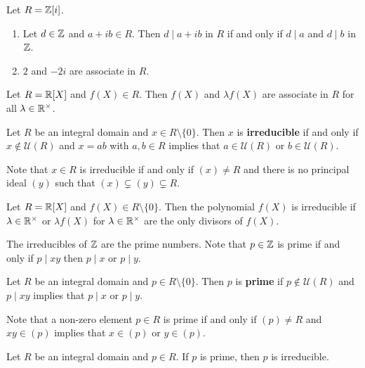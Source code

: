 \begin{example}
	Let $R=\mathbb{Z}[i]$. 
	\begin{enumerate}
		\item Let $d\in\mathbb{Z}$ and $a+ib\in R$. Then $d\mid a+ib$ in $R$ if and only if 
			$d\mid a$ and $d\mid b$ in $\mathbb{Z}$. 
		\item $2$ and $-2i$ are associate in $R$.
	\end{enumerate} 	
\end{example}

\begin{example}
	Let $R=\mathbb{R}[X]$ and $f(X)\in R$. Then $f(X)$ and $\lambda f(X)$ are 
	associate in $R$ for all $\lambda\in\mathbb{R}^{\times}$. 	
\end{example}

\begin{definition}
	Let $R$ be an integral domain and $x\in R\setminus\{0\}$. Then $x$ is \textbf{irreducible} 
	if and only if $x\not\in\mathcal{U}(R)$ 
	and $x=ab$ with $a,b\in R$ implies that $a\in\mathcal{U}(R)$ or $b\in\mathcal{U}(R)$. 
\end{definition}

Note that $x\in R$ is irreducible if and only if $(x)\ne R$ 
and there is no principal ideal $(y)$ such that 
$(x)\subsetneq (y)\subsetneq R$.

\begin{example}
	Let $R=\mathbb{R}[X]$ and $f(X)\in R\setminus\{0\}$. Then the polynomial $f(X)$ is irreducible if 
	$\lambda\in\mathbb{R}^{\times}$ or $\lambda f(X)$ for $\lambda\in\mathbb{R}^{\times}$ 
	are the only divisors
	of $f(X)$.  
\end{example}

The irreducibles of $\mathbb{Z}$ are the prime numbers. Note that $p\in \mathbb{Z}$
is prime if and only if $p\mid xy$ then $p\mid x$ or $p\mid y$. 

\begin{definition}
	Let $R$ be an integral domain and $p\in R\setminus\{0\}$. Then  
	$p$ is \textbf{prime} if $p\not\in\mathcal{U}(R)$ and 
	$p\mid xy$ implies that $p\mid x$ or $p\mid y$. 
\end{definition}

Note that a non-zero element $p\in R$ is prime 
if and only if $(p)\ne R$ and 
$xy\in (p)$ implies that $x\in (p)$ or $y\in (p)$. 

\begin{proposition}
	Let $R$ be an integral domain and $p\in R$. 
	If $p$ is prime, then $p$ is irreducible. 
\end{proposition}

